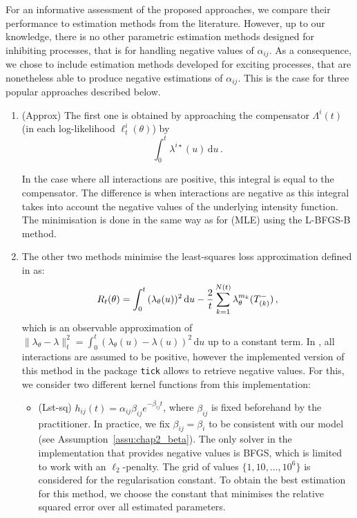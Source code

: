     For an informative assessment of the proposed approaches, we compare their performance to estimation methods from the literature.
    However, up to our knowledge, there is no other parametric estimation methods designed for inhibiting processes, that is for handling negative values of \(\alpha_{ij}\).
    As a consequence, we chose to include estimation methods developed for exciting processes, that are nonetheless able to produce negative estimations of \(\alpha_{ij}\).
    This is the case for three popular approaches described below.

    \begin{enumerate}
        \item (Approx) The first one \parencite{Lemonnier2014} is obtained by approaching the compensator $\Lambda^i(t)$ (in each log-likelihood $\ell^i_t(\theta)$) by \[\int_{0}^{t}{\lambda^{i\star}(u)\,\mathrm{d}u}\,.\]

        In the case where all interactions are positive, this integral is equal to the compensator. The difference is when interactions are negative as this integral takes into account the negative values of the underlying intensity function. The minimisation is done in the same way as for (MLE) using the L-BFGS-B method.

        \item The other two methods minimise the least-squares loss approximation defined in \textcite{Reynaud2014,Bacry2020} as:
        \[R_t(\theta) =  \int_{0}^{t}{(\lambda_{\theta}(u))^2\,\mathrm{d}u} - \frac{2}{t}\sum_{k=1}^{N(t)}{\lambda^{m_k}_{\theta}(T_{(k)}^-)} \,,\]
        which is an observable approximation of \(\|\lambda_\theta - \lambda\|_t^2 = \int_0^t (\lambda_\theta(u) - \lambda(u))^2 \, \mathrm du\) up to a constant term.
        In \textcite{Bacry2020}, all interactions are assumed to be positive, however the implemented version of this method in the package \texttt{tick} \textcite{Bacry2018} allows to retrieve negative values. For this, we consider two different kernel functions from this implementation:
        \begin{itemize}
        \item (Lst-sq) $h_{ij}(t) = \alpha_{ij}\beta_{ij}e^{-\beta_{ij}t}$, where $\beta_{ij}$ is fixed beforehand by the practitioner. In practice, we fix $\beta_{ij} = \beta_i$ to be consistent with our model (see Assumption~\ref{assu:chap2_beta}). The only solver in the implementation that provides negative values is BFGS,
        which is limited to work with an $\ell_2$-penalty. The grid of values $\{1, 10, \ldots, 10^6\}$ is considered for the regularisation constant. To obtain the best estimation for this method, we choose the constant that minimises the relative squared error over all estimated parameters. 
        

\end{itemize}
\end{enumerate}
